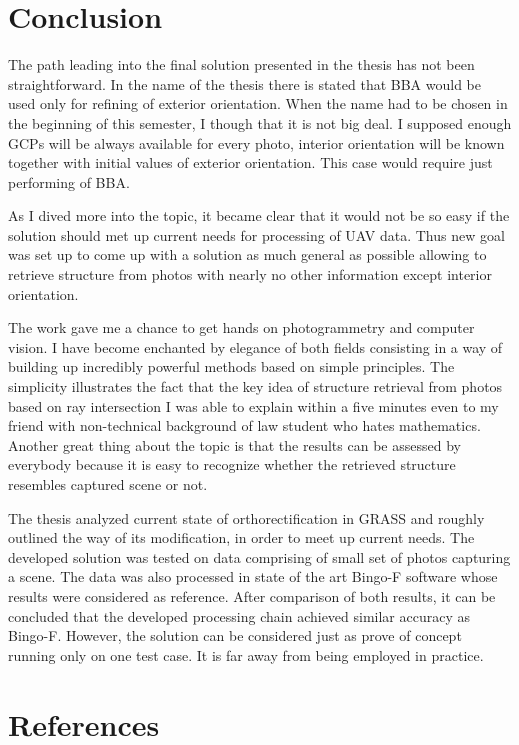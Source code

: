 \documentclass[a4paper,12pt]{article}
\begin{document}
\section{Conclusion}

The path leading into the final solution presented in the thesis has not been straightforward.
In the name of the thesis there is stated that BBA would be 
used only for refining of exterior orientation. When the name had to be chosen in the beginning of this semester, I though that 
it is not big deal. 
I supposed enough GCPs will be 
always available for every photo, interior orientation will be 
known together with initial values of exterior orientation.
This case would require just
performing of BBA.

As I dived more into the topic, it became clear that it would not be so easy 
 if the solution should met up current needs for processing of UAV data.
Thus new goal was set up to come up with a solution as much general 
 as possible allowing to retrieve structure from photos with nearly no other information except interior orientation.
 
The work gave me a chance to get hands on photogrammetry and computer vision. I have become enchanted
by elegance of both fields consisting in a way of building up incredibly powerful methods based on simple principles.  
The simplicity illustrates the fact that the key idea of structure retrieval from photos based on ray intersection
I was able to explain within a five minutes even to my friend with non-technical background of law student who 
  hates mathematics.
Another great thing about the topic is that the results can be assessed
by everybody because it is easy to recognize whether the retrieved structure resembles captured scene or not. 

 The thesis analyzed current state of orthorectification in GRASS and roughly outlined the way of its modification,
 in order to meet up current needs. 
  The developed solution was tested on data comprising of small set of photos capturing a scene.
  The data was also processed in state of the art Bingo-F software whose results were considered as reference.
  After comparison of both results, it can be concluded that the developed processing 
  chain achieved similar accuracy as Bingo-F. However, the solution can be considered just as prove of concept 
  running only on one test case. It is far away from being employed in practice. 


\section{References}
\end{document}
